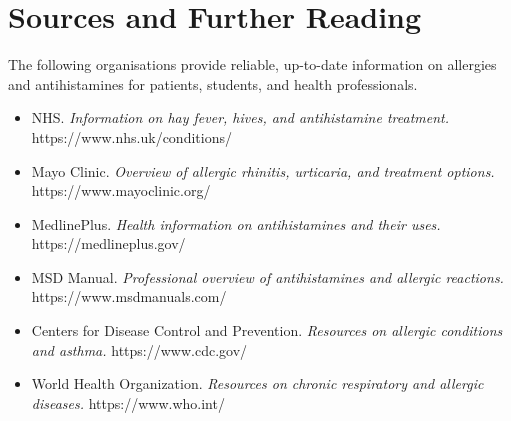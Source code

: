 \section*{Sources and Further Reading}
The following organisations provide reliable, up-to-date information on allergies and antihistamines for patients, students, and health professionals.

\begin{itemize}
    \item NHS. \textit{Information on hay fever, hives, and antihistamine treatment.} https://www.nhs.uk/conditions/
    \item Mayo Clinic. \textit{Overview of allergic rhinitis, urticaria, and treatment options.} https://www.mayoclinic.org/
    \item MedlinePlus. \textit{Health information on antihistamines and their uses.} https://medlineplus.gov/
    \item MSD Manual. \textit{Professional overview of antihistamines and allergic reactions.} https://www.msdmanuals.com/
    \item Centers for Disease Control and Prevention. \textit{Resources on allergic conditions and asthma.} https://www.cdc.gov/
    \item World Health Organization. \textit{Resources on chronic respiratory and allergic diseases.} https://www.who.int/
\end{itemize}
